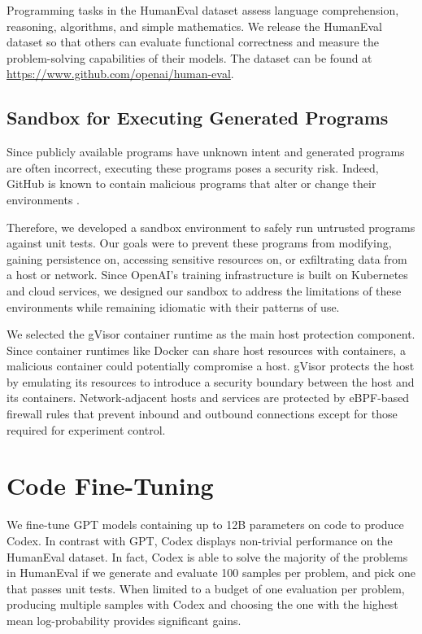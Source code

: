 Programming tasks in the HumanEval dataset assess language comprehension, reasoning, algorithms, and simple mathematics. We release the HumanEval dataset so that others can evaluate functional correctness and measure the problem-solving capabilities of their models. The dataset can be found at \href{https://www.github.com/openai/human-eval}{https://www.github.com/openai/human-eval}.

\subsection{Sandbox for Executing Generated Programs}
\label{sec:eval:sandbox}

Since publicly available programs have unknown intent and generated programs are often incorrect, executing these programs poses a security risk. Indeed, GitHub is known to contain malicious programs that alter or change their environments \cite{rokon}.

Therefore, we developed a sandbox environment to safely run untrusted programs against unit tests. Our goals were to prevent these programs from modifying, gaining persistence on, accessing sensitive resources on, or exfiltrating data from a host or network. Since OpenAI’s training infrastructure is built on Kubernetes and cloud services, we designed our sandbox to address the limitations of these environments while remaining idiomatic with their patterns of use.

We selected the gVisor container runtime \cite{lacasse2018open} as the main host protection component. Since container runtimes like Docker can share host resources with containers, a malicious container could potentially compromise a host. gVisor protects the host by emulating its resources to introduce a security boundary between the host and its containers. Network-adjacent hosts and services are protected by eBPF-based firewall rules that prevent inbound and outbound connections except for those required for experiment control.

\section{Code Fine-Tuning}
\label{sec:ft}

We fine-tune GPT models containing up to 12B parameters on code to produce Codex. In contrast with GPT, Codex displays non-trivial performance on the HumanEval dataset. In fact, Codex is able to solve the majority of the problems in HumanEval if we generate and evaluate 100 samples per problem, and pick one that passes unit tests. When limited to a budget of one evaluation per problem, producing multiple samples with Codex and choosing the one with the highest mean log-probability provides significant gains.

